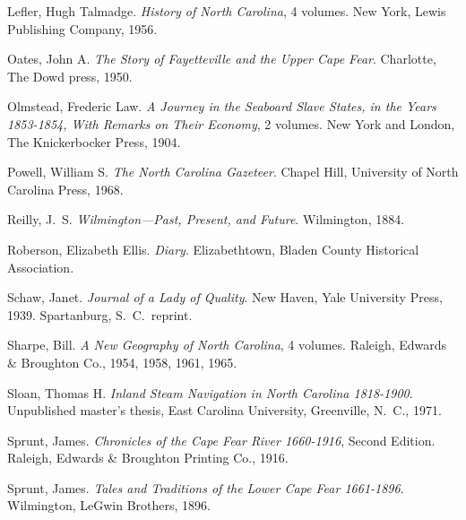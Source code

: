 \documentclass[11pt, a5paper]{book}
\begin{document}
\begin{thebibliography}{99}
  Lefler, Hugh Talmadge.  \emph{History of North Carolina}, 4 volumes.  New
  York, Lewis Publishing Company, 1956.

  Oates, John A.  \emph{The Story of Fayetteville and the Upper Cape Fear}.
  Charlotte, The Dowd press, 1950.

  Olmstead, Frederic Law.  \emph{A Journey in the Seaboard Slave States, in the
    Years 1853-1854, With Remarks on Their Economy}, 2 volumes.  New York and %
  London, The Knickerbocker Press, 1904.

  Powell, William S.  \emph{The North Carolina Gazeteer}.  Chapel Hill,
  University of North Carolina Press, 1968.

  Reilly, J.~S.  \emph{Wilmington---Past, Present, and Future}.  Wilmington,
  1884.

  Roberson, Elizabeth Ellis.  \emph{Diary}.  Elizabethtown, Bladen County Historical Association.

  Schaw, Janet.  \emph{Journal of a Lady of Quality}.  New Haven, Yale
  University Press, 1939.  Spartanburg, S.~C.~reprint.

  Sharpe, Bill.  \emph{A New Geography of North Carolina}, 4 volumes.  Raleigh,
  Edwards \& Broughton Co., 1954, 1958, 1961, 1965.

  Sloan, Thomas H.  \emph{Inland Steam Navigation in North Carolina 1818-1900}. %
  Unpublished master's thesis, East Carolina University, Greenville, N.~C., 1971.

  Sprunt, James.  \emph{Chronicles of the Cape Fear River 1660-1916}, Second %
  Edition.  Raleigh, Edwards \& Broughton Printing Co., 1916.

  Sprunt, James.  \emph{Tales and Traditions of the Lower Cape Fear 1661-1896}. %
  Wilmington, LeGwin Brothers, 1896.


\end{thebibliography}
\end{document}
